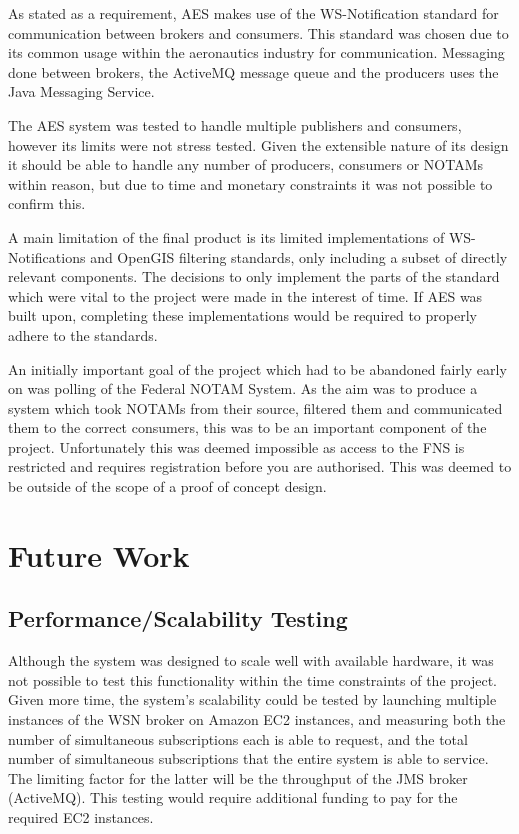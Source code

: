 \documentclass[a4paper, 12pt, twoside]{article}
\begin{document}
As stated as a requirement, AES makes use of the WS-Notification standard for communication between brokers and consumers. This standard was chosen due to its common usage within the aeronautics industry for communication. Messaging done between brokers, the ActiveMQ message queue and the producers uses the Java Messaging Service.

The AES system was tested to handle multiple publishers and consumers, however its limits were not stress tested. Given the extensible nature of its design it should be able to handle any number of producers, consumers or NOTAMs within reason, but due to time and monetary constraints it was not possible to confirm this.

A main limitation of the final product is its limited implementations of WS-Notifications and OpenGIS filtering standards, only including a subset of directly relevant components. The decisions to only implement the parts of the standard which were vital to the project were made in the interest of time. If AES was built upon, completing these implementations would be required to properly adhere to the standards.

An initially important goal of the project which had to be abandoned fairly early on was polling of the Federal NOTAM System. As the aim was to produce a system which took NOTAMs from their source, filtered them and communicated them to the correct consumers, this was to be an important component of the project. Unfortunately this was deemed impossible as access to the FNS is restricted and requires registration before you are authorised. This was deemed to be outside of the scope of a proof of concept design.

\newpage

\section{Future Work}
\label{sec:future_work}

\subsection{Performance/Scalability Testing}
\label{sec:future_testing}

Although the system was designed to scale well with available hardware, it was not possible to test this functionality within the time constraints of the project. Given more time, the system's scalability could be tested by launching multiple instances of the WSN broker on Amazon EC2 instances, and measuring both the number of simultaneous subscriptions each is able to request, and the total number of simultaneous subscriptions that the entire system is able to service. The limiting factor for the latter will be the throughput of the JMS broker (ActiveMQ). This testing would require additional funding to pay for the required EC2 instances.
\end{document}
